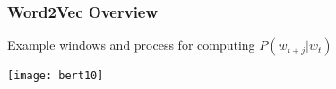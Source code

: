 \begin{frame}[fragile]\frametitle{Word2Vec Overview}
Example windows and process for computing  $P(w_{t+j}|w_t)$


\begin{center}
\texttt{[image: bert10]}
\end{center}	


\end{frame}
















